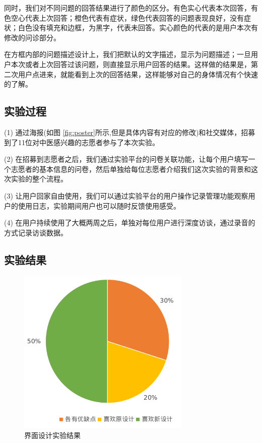 同时，我们对不同问题的回答结果进行了颜色的区分。有色实心代表本次回答，有色空心代表上次回答；橙色代表有症状，绿色代表回答的问题表现良好，没有症状；白色没有填充和边框，为黑字，代表未回答。实心颜色的代表的是用户本次有修改的问诊部分。

在方框内部的问题描述设计上，我们把默认的文字描述，显示为问题描述；一旦用户本次或者上次回答过该问题，则直接显示用户回答的结果。这样做的结果是，第二次用户点进来，就能看到上次的回答结果，这样能够对自己的身体情况有个快速的了解。


\subsection{实验过程}


(1) 通过海报(如图 \ref{fig:poster}所示,但是具体内容有对应的修改)和社交媒体，招募到了11位对中医感兴趣的志愿者参与了本次实验。

(2) 在招募到志愿者之后，我们通过实验平台的问卷关联功能，让每个用户填写一个志愿者的基本信息的问卷，然后单独给每位志愿者介绍我们这次实验的背景和这次实验的整个流程。

(3) 让用户回家自由使用，我们可以通过实验平台的用户操作记录管理功能观察用户的使用日志，实验期间用户也可以随时反馈使用感受。

(4)  在用户持续使用了大概两周之后，单独对每位用户进行深度访谈，通过录音的方式记录访谈数据。



\subsection{实验结果}


\begin{figure}[ht]
    \centering
    \includegraphics[height=8cm]{images/ui-exp.png}
    \caption{界面设计实验结果}
    \label{fig:ui-exp}
\end{figure}

